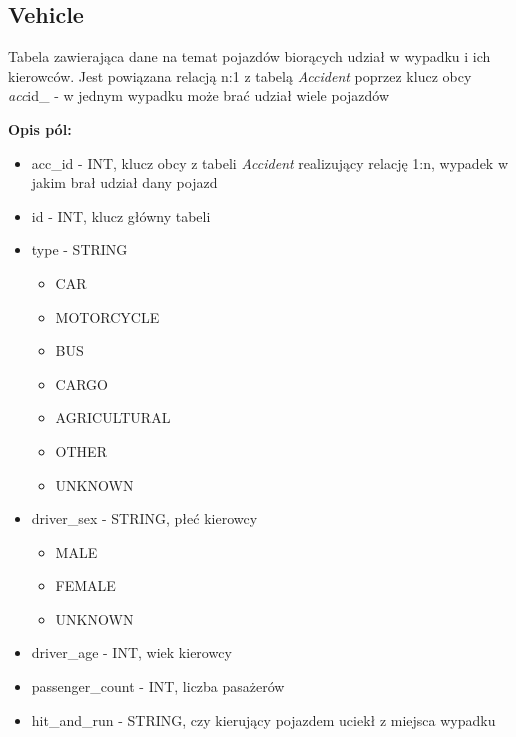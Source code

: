 \subsection{Vehicle}\label{vehicle}

Tabela zawierająca dane na temat pojazdów biorących udział w wypadku i
ich kierowców. Jest powiązana relacją n:1 z tabelą \emph{Accident}
poprzez klucz obcy \emph{acc}id\_ - w jednym wypadku może brać udział
wiele pojazdów

\textbf{Opis pól:}

\begin{itemize}
\item
  acc\_id - INT, klucz obcy z tabeli \emph{Accident} realizujący relację
  1:n, wypadek w jakim brał udział dany pojazd\\
\item
  id - INT, klucz główny tabeli\\
\item
  type - STRING

  \begin{itemize}
  \itemsep-14pt\parskip0pt
  \item
    CAR\\
  \item
    MOTORCYCLE\\
  \item
    BUS\\
  \item
    CARGO\\
  \item
    AGRICULTURAL\\
  \item
    OTHER\\
  \item
    UNKNOWN\\
  \end{itemize}
\item
  driver\_sex - STRING, płeć kierowcy

  \begin{itemize}
  \itemsep-14pt\parskip0pt
  \item
    MALE\\
  \item
    FEMALE\\
  \item
    UNKNOWN\\
  \end{itemize}
\item
  driver\_age - INT, wiek kierowcy\\
\item
  passenger\_count - INT, liczba pasażerów\\
\item
  hit\_and\_run - STRING, czy kierujący pojazdem uciekł z miejsca
  wypadku


\end{itemize}
